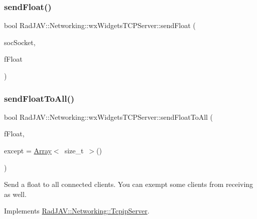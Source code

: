 \subsubsection{\texorpdfstring{send\+Float()}{sendFloat()}}
{\footnotesize\ttfamily bool Rad\+J\+A\+V\+::\+Networking\+::wx\+Widgets\+T\+C\+P\+Server\+::send\+Float (\begin{DoxyParamCaption}\item[{wx\+Socket\+Base $\ast$}]{soc\+Socket,  }\item[{float}]{f\+Float }\end{DoxyParamCaption})}

\mbox{\label{class_rad_j_a_v_1_1_networking_1_1wx_widgets_t_c_p_server_a632a5b94a16bcbd725fb4a9d1f4f73b0}} 
\subsubsection{\texorpdfstring{send\+Float\+To\+All()}{sendFloatToAll()}}
{\footnotesize\ttfamily bool Rad\+J\+A\+V\+::\+Networking\+::wx\+Widgets\+T\+C\+P\+Server\+::send\+Float\+To\+All (\begin{DoxyParamCaption}\item[{float}]{f\+Float,  }\item[{\mbox{\hyperlink{class_rad_j_a_v_1_1_array}{Array}}$<$ size\+\_\+t $>$}]{except = {\ttfamily \mbox{\hyperlink{class_rad_j_a_v_1_1_array}{Array}}$<$~size\+\_\+t~$>$()} }\end{DoxyParamCaption})\hspace{0.3cm}{\ttfamily [virtual]}}

Send a float to all connected clients. You can exempt some clients from receiving as well. 

Implements \mbox{\hyperlink{class_rad_j_a_v_1_1_networking_1_1_tcpip_server_acbcaf04e37feb1dd153fcf719a408bc0}{Rad\+J\+A\+V\+::\+Networking\+::\+Tcpip\+Server}}.

\mbox{\label{class_rad_j_a_v_1_1_networking_1_1wx_widgets_t_c_p_server_a61087019c5c04e8f53f5ab72cacd4535}} 

